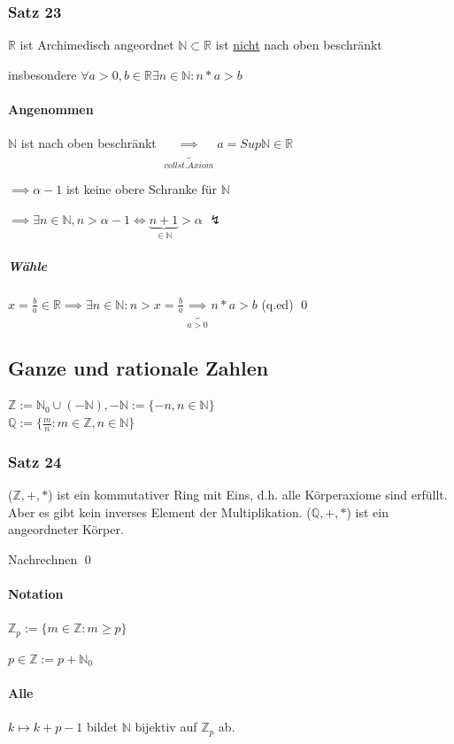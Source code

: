 \documentclass[fleqn]{scrartcl}
\renewenvironment{proof}{{\bfseries Beweis }}{\qed}
\begin{document}
\subsubsection{Satz 23} $\mathbb{R}$ ist Archimedisch angeordnet $\mathbb{N} \subset \mathbb{R}$ ist \underline{nicht} nach oben beschränkt

insbesondere $\forall a > 0, b \in \mathbb{R} \exists n \in \mathbb{N}: n * a > b$

\begin{proof}
\paragraph*{Angenommen} $\mathbb{N}$ ist nach oben beschränkt $\underbrace{\implies}_{vollst. Axiom} a = Sup\mathbb{N}\in\mathbb{R}$

$\implies \alpha - 1$ ist keine obere Schranke für $\mathbb{N}$

$\implies \exists n \in \mathbb{N}, n > \alpha - 1 \iff  \underbrace{n+1}_{\in \mathbb{N}} > \alpha$ $\lightning$
\subparagraph{Wähle}
$x = \frac{b}{a} \in \mathbb{R} \implies \exists n \in \mathbb{N}: n > x = \frac{b}{a} \underbrace{\implies}_{a > 0} n* a > b$ (q.ed)
\end{proof}
\subsection{Ganze und rationale Zahlen}
$\mathbb{Z} := \mathbb{N}_0 \cup (-\mathbb{N}), -\mathbb{N} := \{-n, n \in \mathbb{N}\}$\\$\mathbb{Q}:=\{\frac{m}{n}: m\in\mathbb{Z},n \in\mathbb{N}\}$
\subsubsection{Satz 24}
($\mathbb{Z}, +, *$) ist ein kommutativer Ring mit Eins, d.h. alle Körperaxiome sind erfüllt. Aber es gibt kein inverses Element der Multiplikation. ($\mathbb{Q}, +, *$) ist ein angeordneter Körper.

\begin{proof}
	Nachrechnen
\end{proof}
\paragraph{Notation}$\mathbb{Z}_p := \{ m\in\mathbb{Z}: m\geq p\}$

$p \in \mathbb{Z} := p + \mathbb{N}_0$
\paragraph{Alle} $k \mapsto k + p - 1$ bildet $\mathbb{N}$ bijektiv auf $\mathbb{Z}_p$ ab.
\end{document}
